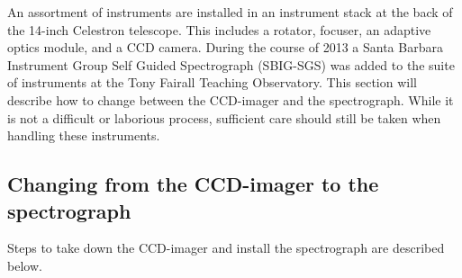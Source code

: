 \documentclass[12pt,twoside,a4paper]{report}
\begin{document}
An assortment of instruments are installed in an instrument stack at the back of the 14-inch Celestron telescope. This includes a rotator, focuser, an adaptive optics module, and a CCD camera. During the course of 2013 a Santa Barbara Instrument Group Self Guided Spectrograph (SBIG-SGS) was added to the suite of instruments at the Tony Fairall Teaching Observatory. This section will describe how to change between the CCD-imager and the spectrograph. While it is not a difficult or laborious process, sufficient care should still be taken when handling these instruments.\\

\subsection{Changing from the CCD-imager to the spectrograph}

Steps to take down the CCD-imager and install the spectrograph are described below.
\end{document}
